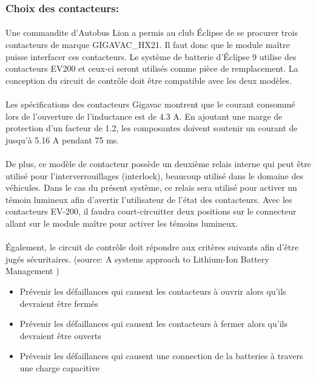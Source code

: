 	\subsubsection*{Choix des contacteurs:}
		\paragraph*{}
		Une commandite d'Autobus Lion a permis au club Éclipse de se procurer trois contacteurs de marque GIGAVAC\_HX21. Il faut donc que le module maître puisse interfacer ces contacteurs. Le système de batterie d'Éclipse 9 utilise des contacteurs EV200 et ceux-ci seront utilisés comme pièce de remplacement. La conception du circuit de contrôle doit être compatible avec les deux modèles.

		\paragraph*{}
		Les spécifications des contacteurs Gigavac montrent que le courant consommé lors de l'ouverture de l'inductance est de 4.3 A. En ajoutant une marge de protection d'un facteur de 1.2, les composantes doivent soutenir un courant de jusqu'à 5.16 A pendant 75 ms. 

		\paragraph*{}
		De plus, ce modèle de contacteur possède un deuxième relais interne qui peut être utilisé pour l'interverrouillages (interlock), beaucoup utilisé dans le domaine des véhicules. Dans le cas du présent système, ce relais sera utilisé pour activer un témoin lumineux afin d'avertir l'utilisateur de l'état des contacteurs. Avec les contacteurs EV-200, il faudra court-circuitter deux positions sur le connecteur allant sur le module maître pour activer les témoins lumineux.

		\paragraph*{}
		Également, le circuit de contrôle doit répondre aux critères suivants afin d'être jugés sécuritaires. (source: A systems approach to Lithium-Ion Battery Management )


		\begin{itemize}
			\item Prévenir les défaillances qui causent les contacteurs à ouvrir alors qu'ils devraient être fermés
			\item Prévenir les défaillances qui causent les contacteurs à fermer alors qu'ils devraient être ouverts
			\item Prévenir les défaillances qui causent une connection de la batteries à travers une charge	capacitive	
		\end{itemize}



